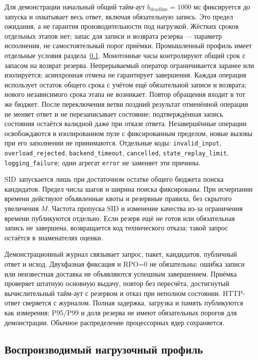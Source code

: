 \documentclass[12pt,a4paper]{article}
\newcommand{\code}[1]{{\ttfamily\small\nolinkurl{#1}}}
\theoremstyle{plainru}
\begin{document}
Для демонстрации начальный общий тайм-аут
$b_{\mathrm{deadline}}=1000$ мс фиксируется до запуска и охватывает
весь ответ, включая обязательную запись. Это предел ожидания,
а не гарантия производительности под нагрузкой. Жёстких сроков отдельных
этапов нет; запас для записи и возврата резерва --- параметр исполнения,
не самостоятельный порог приёмки. Промышленный профиль имеет отдельные
условия раздела~\ref{sec:ops-load-profile}.
Монотонные часы контролируют общий срок с запасом на возврат резерва.
Непрерываемый оператор ограничивается
заранее или изолируется; асинхронная отмена не гарантирует завершения.
Каждая операция использует остаток общего срока с учётом ещё обязательной
записи и возврата; нового независимого срока этапа не возникает.
Повтор обращения входит в тот же бюджет. После переключения ветви
поздний результат отменённой операции не меняет ответ и не перезаписывает
состояние; подтверждённая запись состояния остаётся валидной даже
при отказе ответа. Незавершённые операции освобождаются в изолированном
пуле с фиксированным пределом, новые вызовы при его заполнении
не принимаются. Отдельные коды: \code{invalid_input},
\code{overload_rejected}, \code{backend_timeout}, \code{cancelled},
\code{state_replay_limit}, \code{logging_failure}; один агрегат
\code{error} не заменяет эти причины.

SID запускается лишь при достаточном остатке общего бюджета поиска
кандидатов. Предел числа шагов и ширина поиска фиксированы.
При исчерпании времени действуют объявленные квоты и резервные правила,
без скрытого увеличения $M$. Частота пропуска SID и изменение качества
из-за ограничения времени публикуются отдельно.
Если резерв ещё не готов или обязательная запись не завершена,
возвращается код технического отказа; такой запрос остаётся
в знаменателях оценки.

Демонстрационный журнал связывает запрос, пакет, кандидатов, публичный
ответ и исход. Двухфазная фиксация и RPO=0 не обязательны; ошибка записи
или неизвестная доставка не объявляются успешным завершением.
Приёмка проверяет штатную основную выдачу, повтор без пересчёта,
достигнутый вычислительный тайм-аут с резервом и отказ при неполном состоянии.
HTTP-ответ сверяется с журналом. Полная задержка, загрузка и память
публикуются как измерения; P95/P99 и доля резерва не имеют обязательных
порогов для демонстрации. Обычное распределение процессорных ядер сохраняется.

\subsection{Воспроизводимый нагрузочный профиль}
\label{sec:ops-load-profile}
\end{document}
